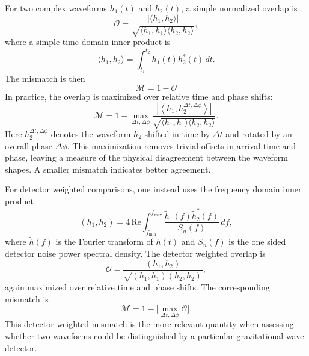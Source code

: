 For two complex waveforms $h_1(t)$ and $h_2(t)$, a simple normalized overlap is
\begin{equation}
    \mathcal{O}
    =
    \frac{
        \left|
        \langle h_1,h_2\rangle
        \right|
    }{
        \sqrt{
            \langle h_1,h_1\rangle
            \langle h_2,h_2\rangle
        }
    },
\end{equation}
where a simple time domain inner product is
\begin{equation}
    \langle h_1,h_2\rangle
    =
    \int_{t_1}^{t_2}
    h_1(t)h_2^*(t)\,dt .
    \label{eq:app waveex time inner product}
\end{equation}
The mismatch is then
\begin{equation}
    \mathcal{M}
    =
    1-\mathcal{O}
\end{equation}
In practice, the overlap is maximized over relative time and phase shifts:
\begin{equation}
    \mathcal{M}
    =
    1
    -
    \max_{\Delta t,\Delta\phi}
    \frac{
        \left|
        \left\langle
            h_1,
            h_2^{\Delta t,\Delta\phi}
        \right\rangle
        \right|
    }{
        \sqrt{
            \langle h_1,h_1\rangle
            \langle h_2,h_2\rangle
        }
    } .
    \label{eq:app waveex mismatch maximized}
\end{equation}
Here $h_2^{\Delta t,\Delta\phi}$ denotes the waveform $h_2$ shifted in time by $\Delta t$ and rotated by an overall phase $\Delta\phi$. This maximization removes trivial offsets in arrival time and phase, leaving a measure of the physical disagreement between the waveform shapes. A smaller mismatch indicates better agreement.

For detector weighted comparisons, one instead uses the frequency domain inner product
\begin{equation}
    \left(h_1,h_2\right)
    =
    4\,\mathrm{Re}
    \int_{f_{\min}}^{f_{\max}}
    \frac{
        \tilde{h}_1(f)\tilde{h}_2^*(f)
    }{
        S_n(f)
    }\,df ,
    \label{eq:app waveex noise inner product}
\end{equation}
where $\tilde{h}(f)$ is the Fourier transform of $h(t)$ and $S_n(f)$ is the one sided detector noise power spectral density. The detector weighted overlap is
\begin{equation}
    \mathcal{O}
    =
    \frac{
        \left(h_1,h_2\right)
    }{
        \sqrt{
            \left(h_1,h_1\right)
            \left(h_2,h_2\right)
        }
    },
    \label{eq:app waveex noise overlap}
\end{equation}
again maximized over relative time and phase shifts. The corresponding mismatch is
\begin{equation}
    \mathcal{M}
    =
    1
    -
   \lbrack \max_{\Delta t,\Delta\phi}
    \mathcal{O} \rbrack.
    \label{eq:app waveex noise mismatch}
\end{equation}
This detector weighted mismatch is the more relevant quantity when assessing whether two waveforms could be distinguished by a particular gravitational wave detector.
